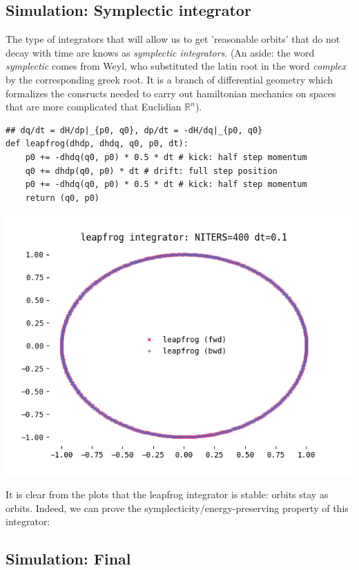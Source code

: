 \documentclass[titlepage]{article}
\newcommand{\R}{\mathbb{R}}
\begin{document}
\subsection{Simulation: Symplectic integrator}

The type of integrators that will allow us to get 'reasonable orbits' that
do not decay with time are knows as \emph{symplectic integrators}.
(An aside: the word \emph{symplectic} comes from Weyl, who substituted
the latin root in the word \emph{complex} by the corresponding greek root.
It is a branch of differential geometry which formalizes the consructs
needed to carry out hamiltonian mechanics on spaces that are more complicated
that Euclidian $\R^n$).

\begin{verbatim}
## dq/dt = dH/dp|_{p0, q0}, dp/dt = -dH/dq|_{p0, q0}
def leapfrog(dhdp, dhdq, q0, p0, dt):
    p0 += -dhdq(q0, p0) * 0.5 * dt # kick: half step momentum
    q0 += dhdp(q0, p0) * dt # drift: full step position
    p0 += -dhdq(q0, p0) * 0.5 * dt # kick: half step momentum
    return (q0, p0)
\end{verbatim}


\includegraphics[width=\textwidth/2]{./leapfrog-dt-0-1.png}

It is clear from the plots that the leapfrog integrator is stable: orbits
stay as orbits. Indeed, we can prove the symplecticity/energy-preserving
property of this integrator:


\subsection{Simulation: Final}
\end{document}
